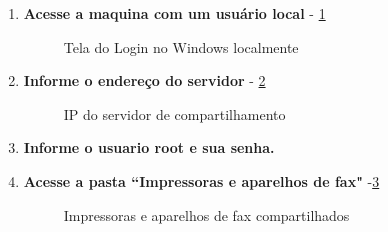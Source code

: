 \begin{enumerate}
	\item \textbf{Acesse a maquina com um usuário local} - \ref{login_windows_local}
		\begin{figure}[ht]
		   	\centering
		   	\caption{Tela do Login no Windows localmente}
		    \label{login_windows_local}
		\end{figure}
		
	\item \textbf{Informe o endereço do servidor} - \ref{server_ip}	
	\begin{figure}[ht]
	   	\centering
	   	\caption{IP do servidor de compartilhamento}
	    \label{server_ip}
	\end{figure}
		
\pagebreak
	
	\item \textbf{Informe o usuario root e sua senha.}	
	
	\item \textbf{Acesse a pasta ``Impressoras e aparelhos de fax"} -\ref{impressora_aparelho_fax}
	\begin{figure}[ht]
	   	\centering
	   	\caption{Impressoras e aparelhos de fax compartilhados}
	    \label{impressora_aparelho_fax}
	\end{figure}


\end{enumerate}
